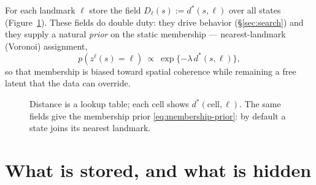 \documentclass[11pt]{article}
\begin{document}
For each landmark $\ell$ store the field $D_\ell(s):=d^{*}(s,\ell)$ over all states
(Figure~\ref{fig:fields}). These fields do double duty: they drive behavior
(\S\ref{sec:search}) and they supply a natural \emph{prior} on the static membership ---
nearest-landmark (Voronoi) assignment,
\begin{equation}
p(z^{\ell}(s)=\ell)\ \propto\ \exp\{-\lambda\,d^{*}(s,\ell)\},
\label{eq:membership-prior}
\end{equation}
so that membership is biased toward spatial coherence while remaining a free latent that the
data can override.

\begin{figure}[htbp]
\centering
{}
\caption{Distance is a lookup table; each cell shows $d^{*}(\text{cell},\ell)$. The same
fields give the membership prior \eqref{eq:membership-prior}: by default a state joins its
nearest landmark.}
\label{fig:fields}
\end{figure}

\section{What is stored, and what is hidden}
\label{sec:hidden}
\end{document}

